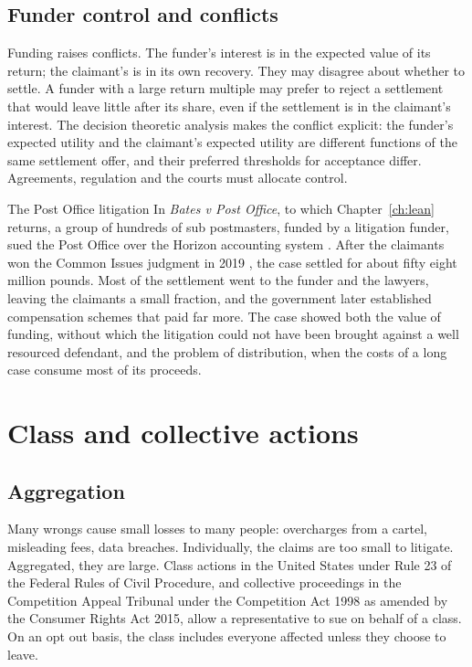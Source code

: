 \subsection{Funder control and conflicts}

Funding raises conflicts. The funder's interest is in the expected value of its return; the claimant's is in its own recovery. They may disagree about whether to settle. A funder with a large return multiple may prefer to reject a settlement that would leave little after its share, even if the settlement is in the claimant's interest. The decision theoretic analysis makes the conflict explicit: the funder's expected utility and the claimant's expected utility are different functions of the same settlement offer, and their preferred thresholds for acceptance differ. Agreements, regulation and the courts must allocate control.

\begin{casebox}{The Post Office litigation}
In \emph{Bates v Post Office}, to which Chapter~\ref{ch:lean} returns, a group of hundreds of sub postmasters, funded by a litigation funder, sued the Post Office over the Horizon accounting system \citep{bates2019}. After the claimants won the Common Issues judgment in 2019 \citep{bates2019common}, the case settled for about fifty eight million pounds. Most of the settlement went to the funder and the lawyers, leaving the claimants a small fraction, and the government later established compensation schemes that paid far more. The case showed both the value of funding, without which the litigation could not have been brought against a well resourced defendant, and the problem of distribution, when the costs of a long case consume most of its proceeds.
\end{casebox}

\section{Class and collective actions}

\subsection{Aggregation}

Many wrongs cause small losses to many people: overcharges from a cartel, misleading fees, data breaches. Individually, the claims are too small to litigate. Aggregated, they are large. Class actions in the United States under Rule 23 of the Federal Rules of Civil Procedure, and collective proceedings in the Competition Appeal Tribunal under the Competition Act 1998 as amended by the Consumer Rights Act 2015, allow a representative to sue on behalf of a class. On an opt out basis, the class includes everyone affected unless they choose to leave.

